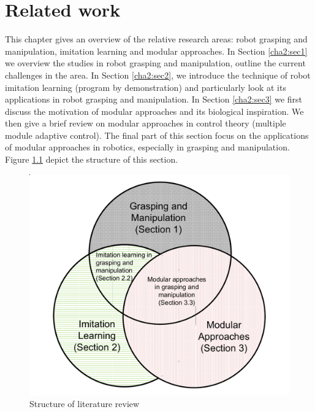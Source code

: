 \chapter{Related work}
\label{cha2}

This chapter gives an overview of the relative research areas: robot grasping and manipulation, imitation learning and modular approaches. In Section \ref{cha2:sec1} we overview the studies in robot grasping and manipulation, outline the current challenges in the area. In Section \ref{cha2:sec2}, we introduce the technique of robot imitation learning (program by demonstration) and particularly look at its applications in robot grasping and manipulation. In Section \ref{cha2:sec3} we first discuss the motivation of modular approaches and its biological inspiration. We then give a brief review on modular approaches in control theory (multiple module adaptive control). The final part of this section focus on the applications of modular approaches in robotics, especially in grasping and manipulation. Figure \ref{fig:litreview} depict the structure of this section.

\begin{figure}
\centering
  \includegraphics[width=12cm]{./fig_cha2/litreview.pdf}
  \caption{Structure of literature review}
  \label{fig:litreview}
\end{figure}





%
%
%





